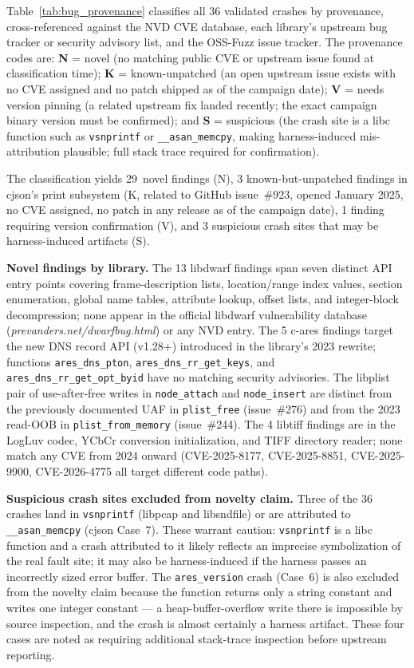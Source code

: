 Table~\ref{tab:bug_provenance} classifies all 36 validated crashes by
provenance, cross-referenced against the NVD CVE database, each
library's upstream bug tracker or security advisory list, and the
OSS-Fuzz issue tracker.  The provenance codes are: \textbf{N} = novel
(no matching public CVE or upstream issue found at classification time);
\textbf{K} = known-unpatched (an open upstream issue exists with no CVE
assigned and no patch shipped as of the campaign date); \textbf{V} =
needs version pinning (a related upstream fix landed recently; the exact
campaign binary version must be confirmed); and \textbf{S} = suspicious
(the crash site is a libc function such as \texttt{vsnprintf} or
\texttt{\_\_asan\_memcpy}, making harness-induced mis-attribution
plausible; full stack trace required for confirmation).



The classification yields 29~novel findings (N), 3 known-but-unpatched
findings in cjson's print subsystem (K, related to GitHub issue~\#923,
opened January 2025, no CVE assigned, no patch in any release as of the
campaign date), 1 finding requiring version confirmation (V), and
3 suspicious crash sites that may be harness-induced artifacts (S).

\textbf{Novel findings by library.}
The 13 libdwarf findings span seven distinct API entry points covering
frame-description lists, location/range index values, section enumeration,
global name tables, attribute lookup, offset lists, and integer-block
decompression; none appear in the official libdwarf vulnerability
database (\textit{prevanders.net/dwarfbug.html}) or any NVD entry.
The 5 c-ares findings target the new DNS record API (v1.28+) introduced
in the library's 2023 rewrite; functions \texttt{ares\_dns\_pton},
\texttt{ares\_dns\_rr\_get\_keys}, and \texttt{ares\_dns\_rr\_get\_opt\_byid}
have no matching security advisories.
The libplist pair of use-after-free writes in \texttt{node\_attach}
and \texttt{node\_insert} are distinct from the previously documented
UAF in \texttt{plist\_free} (issue~\#276) and from the 2023 read-OOB
in \texttt{plist\_from\_memory} (issue~\#244).
The 4 libtiff findings are in the LogLuv codec, YCbCr conversion
initialization, and TIFF directory reader; none match any CVE from 2024
onward (CVE-2025-8177, CVE-2025-8851, CVE-2025-9900, CVE-2026-4775 all
target different code paths).

\textbf{Suspicious crash sites excluded from novelty claim.}
Three of the 36 crashes land in \texttt{vsnprintf} (libpcap and
libsndfile) or are attributed to \texttt{\_\_asan\_memcpy} (cjson
Case~7).  These warrant caution: \texttt{vsnprintf} is a libc function
and a crash attributed to it likely reflects an imprecise symbolization
of the real fault site; it may also be harness-induced if the harness
passes an incorrectly sized error buffer.  The \texttt{ares\_version}
crash (Case~6) is also excluded from the novelty claim because the
function returns only a string constant and writes one integer
constant --- a heap-buffer-overflow write there is impossible by source
inspection, and the crash is almost certainly a harness artifact.
These four cases are noted as requiring additional stack-trace inspection
before upstream reporting.


